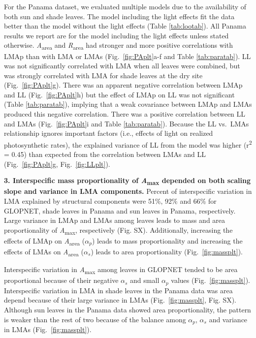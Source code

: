 \documentclass[
  12pt,
  a4paper,
,tablecaptionabove
]{scrartcl}
\begin{document}
For the Panama dataset, we evaluated multiple models due to the availability of both sun and shade leaves.
The model including the light effects fit the data better than the model without the light effects (Table \ref{tab:lootab}).
All Panama results we report are for the model including the light effects unless stated otherwise.
\emph{A}\textsubscript{area} and \emph{R}\textsubscript{area} had stronger and more positive correlations with LMAp than with LMA or LMAs (Fig.~\ref{fig:PAplt}a-f and Table \ref{tab:paratab}).
LL was not significantly correlated with LMA when all leaves were combined, but was strongly correlated with LMA for shade leaves at the dry site (Fig.~\ref{fig:PAplt}g).
There was an apparent negative correlation between LMAp and LL (Fig.~\ref{fig:PAplt}h) but the effect of LMAp on LL was not significant (Table \ref{tab:paratab}), implying that a weak covariance between LMAp and LMAs produced this negative correlation.
There was a positive correlation between LL and LMAs (Fig.~\ref{fig:PAplt}i and Table \ref{tab:paratab}).
Because the LL vs.~LMAs relationship ignores important factors (i.e., effects of light on realized photosynthetic rates), the explained variance of LL from the model was higher (r\textsuperscript{2} = 0.45) than expected from the correlation between LMAs and LL (Fig.~\ref{fig:PAplt}g, Fig.~\ref{fig:LLplt}).

\textbf{3. Interspecific mass proportionality of \emph{A}\textsubscript{max} depended on both scaling slope and variance in LMA components.}
Percent of interspecific variation in LMA explained by structural components were 51\%, 92\% and 66\% for GLOPNET, shade leaves in Panama and sun leaves in Panama, respectively.
Large variance in LMAp and LMAs among leaves leads to mass and area proportionality of \emph{A}\textsubscript{max}, respectively (Fig. SX). Additionally, increasing the effects of LMAp on \emph{A}\textsubscript{area} (\(\alpha_p\)) leads to mass proportionality and increasing the effects of LMAs on \emph{A}\textsubscript{area} (\(\alpha_s\)) leads to area proportionality (Fig.~\ref{fig:massplt}).

Interspecific variation in \emph{A}\textsubscript{max} among leaves in GLOPNET tended to be area proportional because of their negative \(\alpha_s\) and small \(\alpha_p\) values (Fig.~\ref{fig:massplt}).
Interspecific variation in LMA in shade leaves in the Panama data was area depend because of their large variance in LMAs (Fig.~\ref{fig:massplt}, Fig. SX).
Although sun leaves in the Panama data showed area proportionality, the
pattern is weaker than the rest of two because of the balance among \(\alpha_p\), \(\alpha_s\) and variance in LMAs (Fig.~\ref{fig:massplt}).
\end{document}
